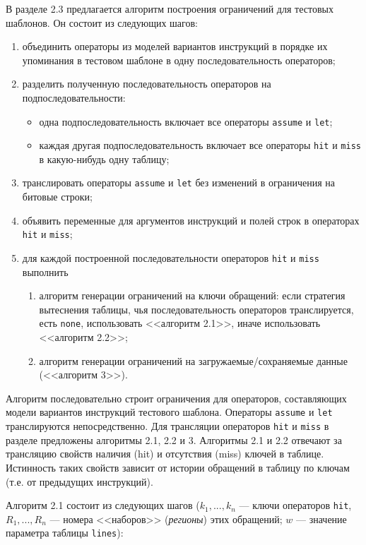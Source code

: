 \documentclass[14pt,autoref,href
,facsimile
]{disser}
\begin{document}
В разделе 2.3 предлагается алгоритм построения ограничений для тестовых шаблонов. Он состоит из следующих шагов:
\begin{enumerate}
    \item объединить операторы из моделей вариантов инструкций в порядке их упоминания в тестовом шаблоне в одну последовательность операторов;
    \item разделить полученную последовательность операторов на
подпоследовательности:
            \begin{itemize}
                \item одна подпоследовательность включает все операторы \texttt{assume} и \texttt{let};
                \item каждая другая подпоследовательность включает все операторы
\texttt{hit} и \texttt{miss} в какую-нибудь одну таблицу;
            \end{itemize}
    \item транслировать операторы \texttt{assume} и \texttt{let} без изменений в
ограничения на битовые строки;
    \item объявить переменные для аргументов инструкций и полей строк в
операторах \texttt{hit} и \texttt{miss};
    \item для каждой построенной последовательности операторов \texttt{hit} и \texttt{miss} выполнить
            \begin{enumerate}
                \item алгоритм генерации ограничений на ключи обращений: если стратегия вытеснения таблицы, чья последовательность операторов транслируется,  есть \texttt{none}, использовать <<алгоритм 2.1>>, иначе использовать <<алгоритм 2.2>>;
                \item алгоритм генерации ограничений на загружаемые/сохраняемые
данные (<<алгоритм 3>>).
            \end{enumerate}
\end{enumerate}

Алгоритм последовательно строит ограничения для операторов, составляющих модели вариантов инструкций тестового шаблона. Операторы \texttt{assume} и \texttt{let} транслируются непосредственно. Для трансляции операторов \texttt{hit} и \texttt{miss} в разделе предложены алгоритмы 2.1, 2.2 и 3. Алгоритмы 2.1 и 2.2 отвечают за трансляцию свойств наличия (hit) и отсутствия (miss) ключей в таблице. Истинность таких свойств зависит от истории обращений в таблицу по ключам (т.е. от предыдущих инструкций).

Алгоритм 2.1 состоит из следующих шагов ($k_1, ..., k_n$ --- ключи операторов \texttt{hit}, $R_1, ..., R_n$ --- номера <<наборов>> (\emph{регионы}) этих обращений; $w$ --- значение параметра таблицы \texttt{lines}):
\end{document}
